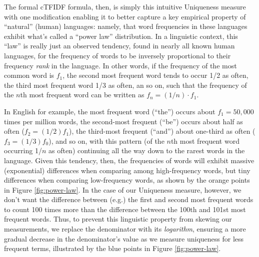 \documentclass[11pt]{article}
\begin{document}
The formal \textsf{cTFIDF} formula, then, is simply this intuitive \textsf{Uniqueness} measure with one modification enabling it to better capture a key empirical property of ``natural'' (human) languages: namely, that word frequencies in these languages exhibit what's called a ``power law'' distribution. In a linguistic context, this ``law'' is really just an observed tendency, found in nearly all known human languages, for the frequency of words to be inversely proportional to their frequency \textit{rank} in the language. In other words, if the frequency of the most common word is $f_1$, the second most frequent word tends to occur 1/2 as often, the third most frequent word 1/3 as often, an so on, such that the frequency of the $n$th most frequent word can be written as $f_n = (1/n)\cdot f_1$.

In English for example, the most frequent word (``the'') occurs about $f_1 = 50,000$ times per million words, the second-most frequent (``be'') occurs about half as often ($f_2 = (1/2)f_1$), the third-most frequent (``and'') about one-third as often ($f_3 = (1/3)f_0$), and so on, with this pattern (of the $n$th most frequent word occurring 1/$n$ as often) continuing all the way down to the rarest words in the language. Given this tendency, then, the frequencies of words will exhibit massive (exponential) differences when comparing among high-frequency words, but tiny differences when comparing low-frequency words, as shown by the orange points in Figure \ref{fig:power-law}. In the case of our \textsf{Uniqueness} measure, however, we don't want the difference between (e.g.) the first and second most frequent words to count 100 times more than the difference between the 100th and 101st most frequent words. Thus, to prevent this linguistic property from skewing our measurements, we replace the denominator with its \textit{logarithm}, ensuring a more gradual decrease in the denominator's value as we measure uniqueness for less frequent terms, illustrated by the blue points in Figure \ref{fig:power-law}.


\end{document}

